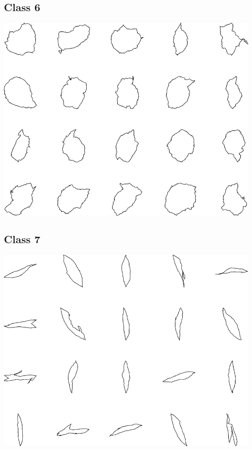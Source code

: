 \documentclass{book}
\begin{document}
\subsection{Class 6}
\includegraphics[width=6in]{output/3.learning/scaled_nts/scaled_nts_6.png}
\subsection{Class 7}
\includegraphics[width=6in]{output/3.learning/scaled_nts/scaled_nts_7.png}
\end{document}
